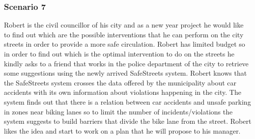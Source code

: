 \subsubsection{Scenario 7}
Robert is the civil councillor of his city and as a new year project he would like to find out which are the possible interventions that he can perform on the city streets in order to provide a more safe circulation. Robert has limited budget so in order to find out which is the optimal intervention to do on the streets he kindly asks to a friend that works in the police department of the city to retrieve some suggestions using the newly arrived SafeStreets system. Robert knows that the SafeStreets system crosses the data offered by the municipality about car accidents with its own information about violations happening in the city. The system finds out that there is a relation between car accidents and unsafe parking in zones near biking lanes so to limit the number of incidents/violations the system suggests to build barriers that divide the bike lane from the street. Robert likes the idea and start to work on a plan that he will propose to his manager.

